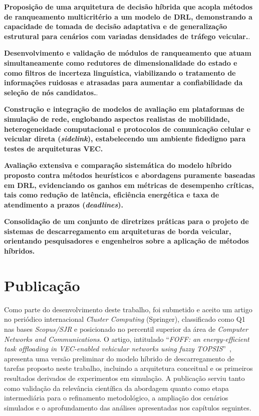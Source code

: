 \begin{alineas}[label=CE\arabic*.]
\item \textbf{Proposição de uma arquitetura de decisão híbrida que acopla métodos de ranqueamento multicritério a um modelo de \gls{DRL}, demonstrando a capacidade de tomada de decisão adaptativa e de generalização estrutural para cenários com variadas densidades de tráfego veicular.}.

\item \textbf{Desenvolvimento e validação de módulos de ranqueamento que atuam simultaneamente como redutores de dimensionalidade do estado e como filtros de incerteza linguística, viabilizando o tratamento de informações ruidosas e atrasadas para aumentar a confiabilidade da seleção de nós candidatos.}.

\item \textbf{Construção e integração de modelos de avaliação em plataformas de simulação de rede, englobando aspectos realistas de mobilidade, heterogeneidade computacional e protocolos de comunicação celular e veicular direta (\textit{sidelink}), estabelecendo um ambiente fidedigno para testes de arquiteturas \gls{VEC}.}

\item \textbf{Avaliação extensiva e comparação sistemática do modelo híbrido proposto contra métodos heurísticos e abordagens puramente baseadas em \gls{DRL}, evidenciando os ganhos em métricas de desempenho críticas, tais como redução de latência, eficiência energética e taxa de atendimento a prazos (\textit{deadlines}).}

\item \textbf{Consolidação de um conjunto de diretrizes práticas para o projeto de sistemas de descarregamento em arquiteturas de borda veicular, orientando pesquisadores e engenheiros sobre a aplicação de métodos híbridos.}

\end{alineas}

\section{Publicação}
\label{sec:publicacao}

Como parte do desenvolvimento deste trabalho, foi submetido e aceito um artigo no periódico internacional \textit{Cluster Computing} (Springer), classificado como Q1 nas bases \textit{Scopus/SJR} e posicionado no percentil superior da área de \textit{Computer Networks and Communications}. O artigo, intitulado ``\textit{FOFF: an energy-efficient task offloading in VEC-enabled vehicular networks using fuzzy TOPSIS}''~\cite{vieira2025}, apresenta uma versão preliminar do modelo híbrido de descarregamento de tarefas proposto neste trabalho, incluindo a arquitetura conceitual e os primeiros resultados derivados de experimentos em simulação. A publicação serviu tanto como validação da relevância científica da abordagem quanto como etapa intermediária para o refinamento metodológico, a ampliação dos cenários simulados e o aprofundamento das análises apresentadas nos capítulos seguintes.

